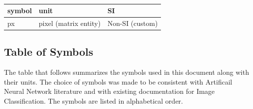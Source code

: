 \documentclass[12pt]{article}
\begin{document}
~\newline

\renewcommand{\arraystretch}{1.2}
\begin{table}[ht]
  \noindent \begin{tabular}{l l l} 
    \toprule		
    \textbf{symbol} & \textbf{unit} & \textbf{SI}\\
    \midrule 
    px & pixel (matrix entity) & 	Non-SI (custom)\\
    \bottomrule
  \end{tabular}
\end{table}




\subsection{Table of Symbols}

The table that follows summarizes the symbols used in this document along with
their units.  The choice of symbols was made to be consistent with Artificail 
Neural Network literature and with existing documentation for Image 
Classification.  The symbols are listed in alphabetical order.
\end{document}
